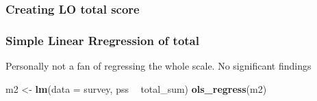\documentclass[]{article}
\newenvironment{Shaded}{\begin{snugshade}}{\end{snugshade}}
\newcommand{\KeywordTok}[1]{\textcolor[rgb]{0.13,0.29,0.53}{\textbf{#1}}}
\newcommand{\DataTypeTok}[1]{\textcolor[rgb]{0.13,0.29,0.53}{#1}}
\newcommand{\DecValTok}[1]{\textcolor[rgb]{0.00,0.00,0.81}{#1}}
\newcommand{\StringTok}[1]{\textcolor[rgb]{0.31,0.60,0.02}{#1}}
\newcommand{\OperatorTok}[1]{\textcolor[rgb]{0.81,0.36,0.00}{\textbf{#1}}}
\newcommand{\NormalTok}[1]{#1}
\begin{document}
\subsubsection{Creating LO total score}\label{creating-lo-total-score}

\begin{Shaded}
\end{Shaded}

\subsubsection{Simple Linear Rregression of
total}\label{simple-linear-rregression-of-total}

Personally not a fan of regressing the whole scale. No significant
findings

\begin{Shaded}
\begin{Highlighting}[]
\NormalTok{m2 <-}\StringTok{ }\KeywordTok{lm}\NormalTok{(}\DataTypeTok{data =}\NormalTok{ survey, pss }\OperatorTok{~}\StringTok{ }\NormalTok{total_sum)}
\KeywordTok{ols_regress}\NormalTok{(m2)}
\end{Highlighting}
\end{Shaded}
\end{document}
